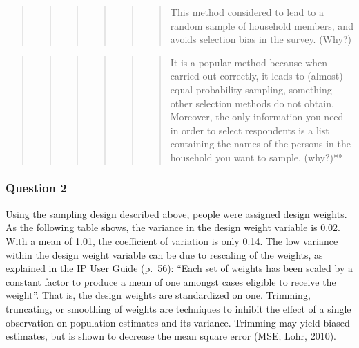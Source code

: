 \documentclass[]{article}
\begin{document}
\begin{quote}
\begin{quote}
\begin{quote}
\begin{quote}
\begin{quote}
\begin{quote}
This method considered to lead to a random sample of household members,
and avoids selection bias in the survey. (Why?)
\end{quote}
\end{quote}
\end{quote}
\end{quote}
\end{quote}
\end{quote}

\begin{quote}
\begin{quote}
\begin{quote}
\begin{quote}
\begin{quote}
\begin{quote}
It is a popular method because when carried out correctly, it leads to
(almost) equal probability sampling, something other selection methods
do not obtain. Moreover, the only information you need in order to
select respondents is a list containing the names of the persons in the
household you want to sample. (why?)**
\end{quote}
\end{quote}
\end{quote}
\end{quote}
\end{quote}
\end{quote}

\subsubsection{Question 2}\label{question-2}

Using the sampling design described above, people were assigned design
weights. As the following table shows, the variance in the design weight
variable is 0.02. With a mean of 1.01, the coefficient of variation is
only 0.14. The low variance within the design weight variable can be due
to rescaling of the weights, as explained in the IP User Guide (p.~56):
``Each set of weights has been scaled by a constant factor to produce a
mean of one amongst cases eligible to receive the weight''. That is, the
design weights are standardized on one. Trimming, truncating, or
smoothing of weights are techniques to inhibit the effect of a single
observation on population estimates and its variance. Trimming may yield
biased estimates, but is shown to decrease the mean square error (MSE;
Lohr, 2010).
\end{document}
